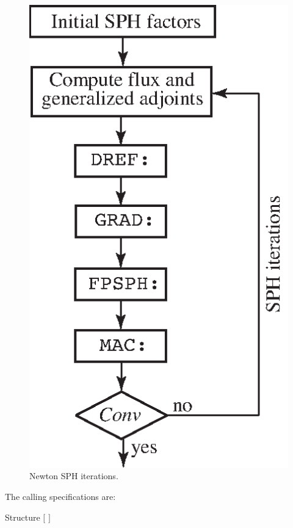 \begin{figure}[h!]
\begin{center}
\includegraphics[scale=0.85]{Figures/flow_newton.eps} 
\caption{Newton SPH iterations.}\label{fig:fig_fnewton}
\end{center}
\end{figure}

\clearpage

The calling specifications are:

\begin{DataStructure}{Structure }
 \moc{:=}  $[$  $]$   \moc{::} 
\end{DataStructure}

